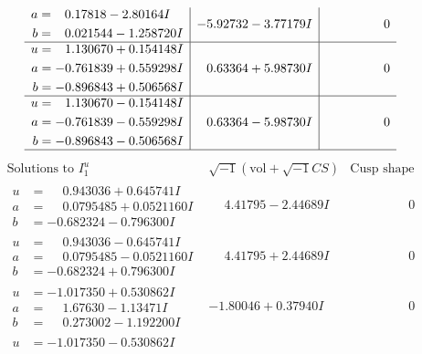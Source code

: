 \documentclass[1p]{elsarticle_modified}
\theoremstyle{definition}
\newcommand{\I}{\sqrt{-1}}
\begin{document}
$$\begin{array}{c|c|c}
\begin{aligned}
a &= \phantom{-}0.17818 - 2.80164 I \\
b &= \phantom{-}0.021544 - 1.258720 I\end{aligned}
 & -5.92732 - 3.77179 I & \phantom{-0.000000 } 0 \\ \hline\begin{aligned}
u &= \phantom{-}1.130670 + 0.154148 I \\
a &= -0.761839 + 0.559298 I \\
b &= -0.896843 + 0.506568 I\end{aligned}
 & \phantom{-}0.63364 + 5.98730 I & \phantom{-0.000000 } 0 \\ \hline\begin{aligned}
u &= \phantom{-}1.130670 - 0.154148 I \\
a &= -0.761839 - 0.559298 I \\
b &= -0.896843 - 0.506568 I\end{aligned}
 & \phantom{-}0.63364 - 5.98730 I & \phantom{-0.000000 } 0\\
 \hline 
 \end{array}$$\newpage$$\begin{array}{c|c|c}  
\text{Solutions to }I^u_{1}& \I (\text{vol} + \sqrt{-1}CS) & \text{Cusp shape}\\
 \hline 
\begin{aligned}
u &= \phantom{-}0.943036 + 0.645741 I \\
a &= \phantom{-}0.0795485 + 0.0521160 I \\
b &= -0.682324 - 0.796300 I\end{aligned}
 & \phantom{-}4.41795 - 2.44689 I & \phantom{-0.000000 } 0 \\ \hline\begin{aligned}
u &= \phantom{-}0.943036 - 0.645741 I \\
a &= \phantom{-}0.0795485 - 0.0521160 I \\
b &= -0.682324 + 0.796300 I\end{aligned}
 & \phantom{-}4.41795 + 2.44689 I & \phantom{-0.000000 } 0 \\ \hline\begin{aligned}
u &= -1.017350 + 0.530862 I \\
a &= \phantom{-}1.67630 - 1.13471 I \\
b &= \phantom{-}0.273002 - 1.192200 I\end{aligned}
 & -1.80046 + 0.37940 I & \phantom{-0.000000 } 0 \\ \hline\begin{aligned}
u &= -1.017350 - 0.530862 I \\

\end{aligned}
\end{array}$$
\end{document}
